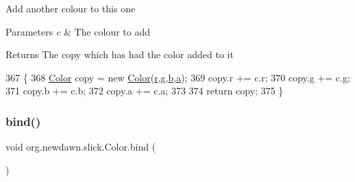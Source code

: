 Add another colour to this one


\begin{DoxyParams}{Parameters}
{\em c} & The colour to add \\
\hline
\end{DoxyParams}
\begin{DoxyReturn}{Returns}
The copy which has had the color added to it 
\end{DoxyReturn}

\begin{DoxyCode}
367                                     \{
368         \mbox{\hyperlink{classorg_1_1newdawn_1_1slick_1_1_color_a39db992a7910141605cc2acb953c4917}{Color}} copy = \textcolor{keyword}{new} \mbox{\hyperlink{classorg_1_1newdawn_1_1slick_1_1_color_a39db992a7910141605cc2acb953c4917}{Color}}(\mbox{\hyperlink{classorg_1_1newdawn_1_1slick_1_1_color_ac07fa95108064b044dcf9a53e95dcb48}{r}},\mbox{\hyperlink{classorg_1_1newdawn_1_1slick_1_1_color_aa6ebff7c102a1476e7b511a78397b753}{g}},\mbox{\hyperlink{classorg_1_1newdawn_1_1slick_1_1_color_a8c0cef152e16438fee852a97e50ef7a5}{b}},\mbox{\hyperlink{classorg_1_1newdawn_1_1slick_1_1_color_ab9288c822ff7614a77c887eb8c2595a7}{a}});
369         copy.r += c.r;
370         copy.g += c.g;
371         copy.b += c.b;
372         copy.a += c.a;
373         
374         \textcolor{keywordflow}{return} copy;
375     \}
\end{DoxyCode}
\mbox{\label{classorg_1_1newdawn_1_1slick_1_1_color_ae4b71c94854f7983f2ccdb7340438e23}} 
\subsubsection{\texorpdfstring{bind()}{bind()}}
{\footnotesize\ttfamily void org.\+newdawn.\+slick.\+Color.\+bind (\begin{DoxyParamCaption}{ }\end{DoxyParamCaption})\hspace{0.3cm}{\ttfamily [inline]}}

